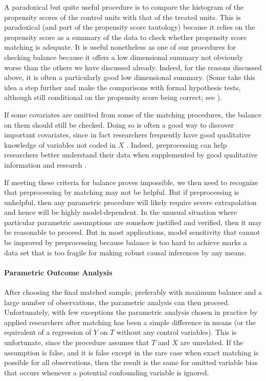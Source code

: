 \documentclass[11pt,titlepage]{article}
\begin{document}
A paradoxical but quite useful procedure is to compare the histogram
of the propensity scores of the control units with that of the treated
units. This is paradoxical (and part of the propensity score
tautology) because it relies on the propensity score as a summary of
the data to check whether propensity score matching is adequate.  It
is useful nonetheless as one of our procedures for checking balance
because it offers a low dimensional summary not obviously worse than
the others we have discussed already.  Indeed, for the reasons
discussed above, it is often a particularly good low dimensional
summary. (Some take this idea a step further and make the comparisons
with formal hypothesis tests, although still conditional on the
propensity score being correct; see \citealp{Sekhon04b}).

If some covariates are omitted from some of the matching procedures,
the balance on them should still be checked.  Doing so is often a good
way to discover important covariates, since in fact researchers
frequently have good qualitative knowledge of variables not coded in
$X$ \citep[][Ch.3]{Rosenbaum02}.  Indeed, preprocessing can help
researchers better understand their data when supplemented by good
qualitative information and research \citep[e.g.,][]{RosSil01}.

If meeting these criteria for balance proves impossible, we then need
to recognize that preprocessing by matching may not be helpful.  But
if preprocessing is unhelpful, then any parametric procedure will
likely require severe extrapolation and hence will be highly
model-dependent.  In the unusual situation where particular parametric
assumptions are somehow justified and verified, then it may be
reasonable to proceed.  But in most applications, model sensitivity
that cannot be improved by preprocessing because balance is too hard
to achieve marks a data set that is too fragile for making robust
causal inferences by any means.

\paragraph{Parametric Outcome Analysis}  
After choosing the final matched sample, preferably with maximum
balance and a large number of observations, the parametric analysis
can then proceed.  Unfortunately, with few exceptions the parametric
analysis chosen in practice by applied researchers after matching has
been a simple difference in means (or the equivalent of a regression
of $Y$ on $T$ without any control variables).  This is unfortunate,
since the procedure assumes that $T$ and $X$ are unrelated.  If the
assumption is false, and it is false except in the rare case when
exact matching is possible for all observations, then the result is
the same for omitted variable bias that occurs whenever a potential
confounding variable is ignored.
\end{document}
